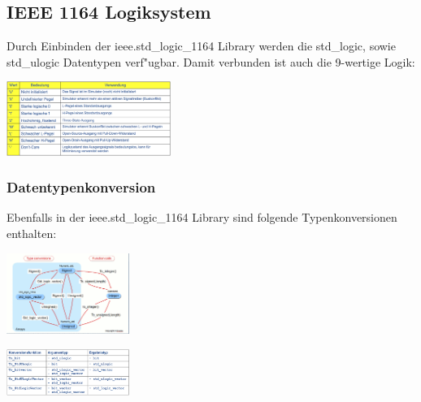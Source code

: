 	\begin{multicols}{2}
		\subsection{IEEE 1164 Logiksystem}
			Durch Einbinden der ieee.std\_logic\_1164 Library werden die std\_logic, sowie 
			std\_ulogic Datentypen verf"ugbar. Damit verbunden ist auch die 9-wertige Logik:
			\begin{center}
				\includegraphics[width=0.4\textwidth]{pics/ieee1164logicsystem}
			\end{center}
		\subsubsection{Datentypenkonversion}
			Ebenfalls in der ieee.std\_logic\_1164 Library sind folgende Typenkonversionen 
			enthalten:
			\begin{center}
				\includegraphics[width=0.3\textwidth]{pics/typeconversion2}
			\end{center}
			\begin{center}
					\includegraphics[width=0.3\textwidth]{pics/typeconversion}
			\end{center}

\end{multicols}
